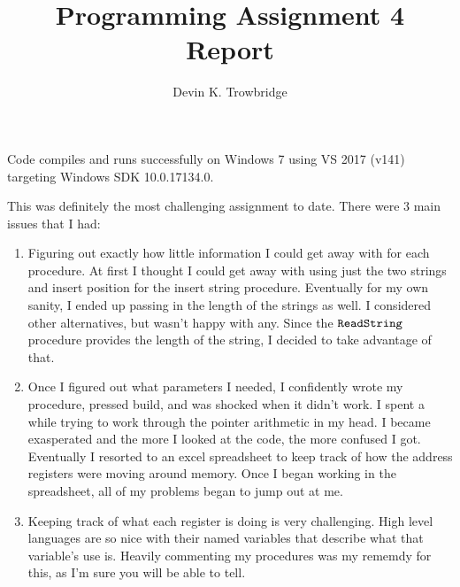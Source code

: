 \documentclass[a4paper,10pt]{article}
\title{Programming Assignment 4 Report}
\author{Devin K. Trowbridge}
\begin{document}
\maketitle

Code compiles and runs successfully on Windows 7 using VS 2017 (v141) targeting Windows SDK 10.0.17134.0.

This was definitely the most challenging assignment to date. There were 3 main issues that I had:
\begin{enumerate}
  \item Figuring out exactly how little information I could get away with for each procedure. At first I thought I could get away with using just the two strings and insert position for the insert string procedure. Eventually for my own sanity, I ended up passing in the length of the strings as well. I considered other alternatives, but wasn't happy with any. Since the $\verb|ReadString|$ procedure provides the length of the string, I decided to take advantage of that.
  \item Once I figured out what parameters I needed, I confidently wrote my procedure, pressed build, and was shocked when it didn't work. I spent a while trying to work through the pointer arithmetic in my head. I became exasperated and the more I looked at the code, the more confused I got. Eventually I resorted to an excel spreadsheet to keep track of how the address registers were moving around memory. Once I began working in the spreadsheet, all of my problems began to jump out at me. 
  \item Keeping track of what each register is doing is very challenging. High level languages are so nice with their named variables that describe what that variable's use is. Heavily commenting my procedures was my rememdy for this, as I'm sure you will be able to tell.
\end{enumerate}
\end{document}
